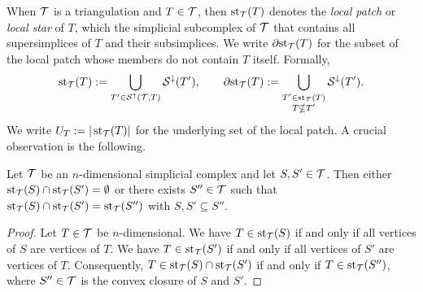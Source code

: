 \documentclass[10pt,letterpaper]{article}
\begin{document}
When ${\mathcal T}$ is a triangulation and $T \in {\mathcal T}$, then $\operatorname{st}_{{\mathcal T}}(T)$ denotes the \emph{local patch} or \textit{local star} of $T$, 
which the simplicial subcomplex of ${\mathcal T}$ that contains all supersimplices of $T$ and their subsimplices. 
We write ${\partial \rm st}_{{\mathcal T}}(T)$ for the subset of the local patch whose members do not contain $T$ itself. 
Formally,
\begin{gather*}
    \operatorname{st}_{{\mathcal T}}(T) := \bigcup_{ T' \in {\mathcal S}^{\uparrow}({\mathcal T},T) } {\mathcal S}^{\downarrow}(T'),
    \qquad 
    {\partial \rm st}_{{\mathcal T}}(T) := \bigcup_{ \substack{ T' \in \operatorname{st}_{{\mathcal T}}(T) \\ T \nsubseteq T' } } {\mathcal S}^{\downarrow}(T').
\end{gather*}
We write $U_T := | \operatorname{st}_{{\mathcal T}}(T) |$ for the underlying set of the local patch. 
A crucial observation is the following.  

\begin{lemma}
 Let ${\mathcal T}$ be an $n$-dimensional simplicial complex and let $S,S' \in {\mathcal T}$.
 Then either $\operatorname{st}_{{\mathcal T}}(S) \cap \operatorname{st}_{{\mathcal T}}(S') = \emptyset$ or there exists $S'' \in {\mathcal T}$
 such that $\operatorname{st}_{{\mathcal T}}(S) \cap \operatorname{st}_{{\mathcal T}}(S') = \operatorname{st}_{{\mathcal T}}(S'')$ with $S, S' \subseteq S''$.
\end{lemma}
\begin{proof}
 Let $T \in {\mathcal T}$ be $n$-dimensional.
 We have $T \in \operatorname{st}_{{\mathcal T}}(S )$ if and only if all vertices of $S $ are vertices of $T$.
 We have $T \in \operatorname{st}_{{\mathcal T}}(S')$ if and only if all vertices of $S'$ are vertices of $T$.
 Consequently, $T \in \operatorname{st}_{{\mathcal T}}(S) \cap \operatorname{st}_{{\mathcal T}}(S')$ if and only if $T \in \operatorname{st}_{{\mathcal T}}(S'')$,
 where $S'' \in {\mathcal T}$ is the convex closure of $S$ and $S'$.
\end{proof}
\end{document}
